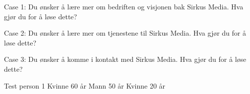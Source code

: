 Case 1: 
Du ønsker å lære mer om bedriften og visjonen bak Sirkus Media. Hva gjør du for å løse dette?

Case 2:
Du ønsker å lære mer om tjenestene til Sirkus Media. Hva gjør du for å løse dette?

Case 3:
Du ønsker å komme i kontakt med Sirkus Media. Hva gjør du for å løse dette?

Test person 1
Kvinne 60 år
Mann 50 år
Kvinne 20 år






